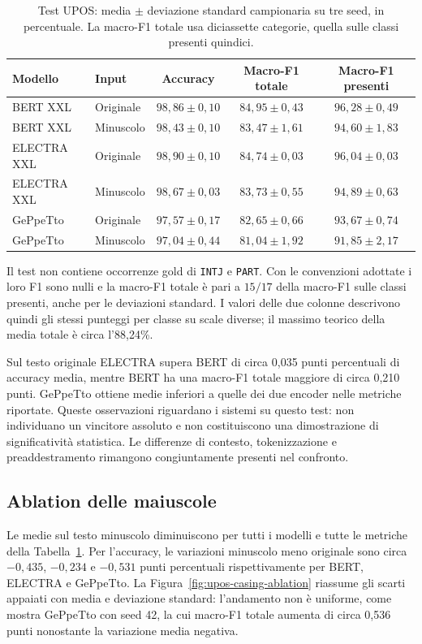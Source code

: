 \documentclass[12pt,a4paper]{report}
\begin{document}
\begin{table}[!htbp]
\centering\small
\begin{tabular}{llccc}
\toprule
Modello & Input & Accuracy & Macro-F1 totale & Macro-F1 presenti\\
\midrule
BERT XXL & Originale & $98{,}86\pm0{,}10$ & $84{,}95\pm0{,}43$ & $96{,}28\pm0{,}49$\\
BERT XXL & Minuscolo & $98{,}43\pm0{,}10$ & $83{,}47\pm1{,}61$ & $94{,}60\pm1{,}83$\\
ELECTRA XXL & Originale & $98{,}90\pm0{,}10$ & $84{,}74\pm0{,}03$ & $96{,}04\pm0{,}03$\\
ELECTRA XXL & Minuscolo & $98{,}67\pm0{,}03$ & $83{,}73\pm0{,}55$ & $94{,}89\pm0{,}63$\\
GePpeTto & Originale & $97{,}57\pm0{,}17$ & $82{,}65\pm0{,}66$ & $93{,}67\pm0{,}74$\\
GePpeTto & Minuscolo & $97{,}04\pm0{,}44$ & $81{,}04\pm1{,}92$ & $91{,}85\pm2{,}17$\\
\bottomrule
\end{tabular}
\caption{Test UPOS: media $\pm$ deviazione standard campionaria su tre seed, in percentuale. La macro-F1 totale usa diciassette categorie, quella sulle classi presenti quindici.}
\label{tab:upos-results}
\end{table}

Il test non contiene occorrenze gold di \texttt{INTJ} e \texttt{PART}. Con le convenzioni adottate i loro F1 sono nulli e la macro-F1 totale è pari a $15/17$ della macro-F1 sulle classi presenti, anche per le deviazioni standard. I valori delle due colonne descrivono quindi gli stessi punteggi per classe su scale diverse; il massimo teorico della media totale è circa l'88,24\%.

Sul testo originale ELECTRA supera BERT di circa 0,035 punti percentuali di accuracy media, mentre BERT ha una macro-F1 totale maggiore di circa 0,210 punti. GePpeTto ottiene medie inferiori a quelle dei due encoder nelle metriche riportate. Queste osservazioni riguardano i sistemi su questo test: non individuano un vincitore assoluto e non costituiscono una dimostrazione di significatività statistica. Le differenze di contesto, tokenizzazione e preaddestramento rimangono congiuntamente presenti nel confronto.

\subsection{Ablation delle maiuscole}
Le medie sul testo minuscolo diminuiscono per tutti i modelli e tutte le metriche della Tabella~\ref{tab:upos-results}. Per l'accuracy, le variazioni minuscolo meno originale sono circa $-0{,}435$, $-0{,}234$ e $-0{,}531$ punti percentuali rispettivamente per BERT, ELECTRA e GePpeTto. La Figura~\ref{fig:upos-casing-ablation} riassume gli scarti appaiati con media e deviazione standard: l'andamento non è uniforme, come mostra GePpeTto con seed 42, la cui macro-F1 totale aumenta di circa 0,536 punti nonostante la variazione media negativa.
\end{document}
